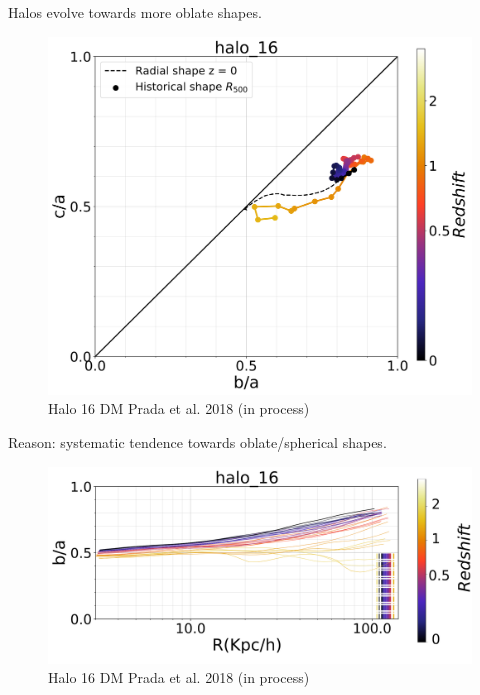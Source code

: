 \documentclass[xcolor=dvipsnames]{beamer}
\begin{document}
\begin{frame}
\centering
Halos evolve towards more oblate shapes.
\begin{figure}[!ht]
  \centering
 \includegraphics[width=0.6\columnwidth]{../Document/pics/Redshift/halo_16_level3_DM_Z_Triax.png}
 \caption{Halo 16 DM \tiny Prada et al. 2018 (in process)}
  
  \label{fig:RedshiftDM}
\end{figure}

\end{frame}


\begin{frame}
\centering
Reason: systematic tendence towards oblate/spherical shapes.
\begin{figure}[!ht]
  \centering
  \includegraphics[width=1\columnwidth]{./pics/halo_16_level3_DM_Z.png}
  \caption{Halo 16 DM \tiny Prada et al. 2018 (in process)}
  \hfill

\end{figure}
\end{frame}
\end{document}
